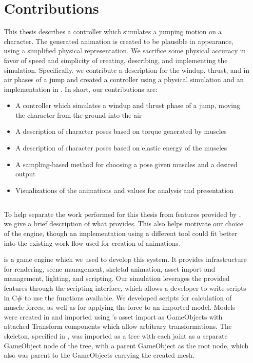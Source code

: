 \section{Contributions}
	This thesis describes a controller which simulates a jumping motion on a character.  The generated animation is created to be plausible in appearance, using a simplified physical representation.  We sacrifice some physical accuracy in favor of speed and simplicity of creating, describing, and implementing the simulation.  Specifically, we contribute a description for the windup, thrust, and in air phases of a jump and created a controller using a physical simulation and an implementation in \unity{}.  In short, our contributions are:
	\begin{itemize}
		\item A controller which simulates a windup and thrust phase of a jump, moving the character from the ground into the air
		\item A description of character poses based on torque generated by muscles
		\item A description of character poses based on elastic energy of the muscles
		\item A sampling-based method for choosing a pose given muscles and a desired output
		\item Visualizations of the animations and values for analysis and presentation
	\end{itemize}

\subsection{\unity{}}
	To help separate the work performed for this thesis from features provided by \unity{}, we give a brief description of what \unity{} provides.  This also helps motivate our choice of the engine, though an implementation using a different tool could fit better into the existing work flow used for creation of animations.
	
	\unity{} is a game engine which we used to develop this system.  It provides infrastructure for rendering, scene management, skeletal animation, asset import and management, lighting, and scripting.  Our simulation leverages the provided features through the \unity{} scripting interface, which allows a developer to write scripts in C\# to use the functions available.  We developed scripts for calculation of muscle forces, as well as for applying the force to an imported model.  Models were created in \maya{} and imported using \unity{}'s asset import as \unity{} GameObjects with attached Transform components which allow arbitrary transformations.  The skeleton, specified in \maya{}, was imported as a tree with each joint as a separate GameObject node of the tree, with a parent GameObject as the root node, which also was parent to the GameObjects carrying the created mesh.
	
